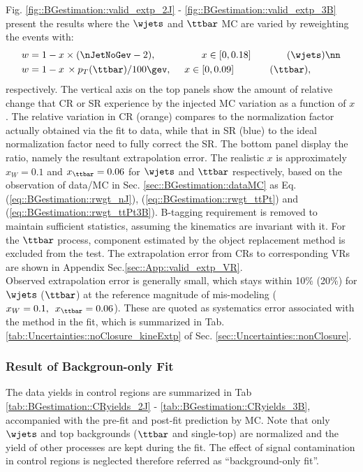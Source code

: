 Fig. \ref{fig::BGestimation::valid_extp_2J} - \ref{fig::BGestimation::valid_extp_3B} present the results where the $\wjets$ and $\ttbar$ MC are varied by reweighting the events with:
\begin{align}
 w & = 1 - x \times (\nJetNoGev-2), \mbox{\phantom{MMMM}}\,\,\,\,\,\, x \in [0,0.18]  \mbox{\phantom{MMMM}} (\wjets) \nn  \\
 w & = 1 - x \,\times p_T(\ttbar)/100\gev, \,\,\,\,\,\,\,\,           x \in [0,0.09]  \mbox{\phantom{MMMM}} (\ttbar),
\label{eq::BGestimation::injected_MCvariation}
\end{align}
respectively. The vertical axis on the top panels show the amount of relative change that CR or SR experience by the injected MC variation as a function of $x$. The relative variation in CR (orange) compares to the normalization factor actually obtained via the fit to data, while that in SR (blue) to the ideal normalization factor need to fully correct the SR. The bottom panel display the ratio, namely the resultant extrapolation error. The realistic $x$ is approximately $x_W=0.1$ and $x_{\ttbar}=0.06$ for $\wjets$ and $\ttbar$ respectively, based on the observation of data/MC in Sec. \ref{sec::BGestimation::dataMC} as Eq. (\ref{eq::BGestimation::rwgt_nJ}), (\ref{eq::BGestimation::rwgt_ttPt}) and (\ref{eq::BGestimation::rwgt_ttPt3B}). B-tagging requirement is removed to maintain sufficient statistics, assuming the kinematics are invariant with it. For the $\ttbar$ process, component estimated by the object replacement method is excluded from the test. The extrapolation error from CRs to corresponding VRs are shown in Appendix Sec.\ref{sec::App::valid_extp_VR}. \\

Observed extrapolation error is generally small, which stays within 10$\%$ (20$\%$) for $\wjets$ ($\ttbar$) at the reference magnitude of mis-modeling ($x_W=0.1, \,\,\, x_{\ttbar}=0.06$). These are quoted as systematics error associated with the method in the fit, which is summarized in Tab. \ref{tab::Uncertainties::noClosure_kineExtp} of Sec. \ref{sec::Uncertainties::nonClosure}. \\

\clearpage
%



\clearpage

\subsubsection{Result of Backgroun-only Fit} \label{sec::BGestimation::kineExtp::result}
The data yields in control regions are summarized in Tab \ref{tab::BGestimation::CRyields_2J} - \ref{tab::BGestimation::CRyields_3B}, accompanied with the pre-fit and post-fit prediction by MC. Note that only $\wjets$ and top backgrounds ($\ttbar$ and single-top) are normalized and the yield of other processes are kept during the fit. The effect of signal contamination in control regions is neglected therefore referred as ``background-only fit''. \\

